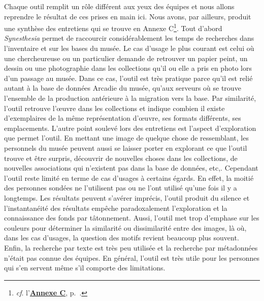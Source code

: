 Chaque outil remplit un rôle différent aux yeux des équipes et nous allons reprendre le résultat de ces prises en main ici. Nous avons, par ailleurs, produit une synthèse des entretiens qui se trouve en Annexe C\footnote{\textit{cf}. l'\textbf{\hyperref[sec:Annexe C]{Annexe C}}, p.~\pageref{sec:Entretiens_2025}.}. Tout d'abord \textit{Synesthesia} permet de raccourcir considérablement les temps de recherches dans l'inventaire et sur les bases du musée. Le cas d'usage le plus courant est celui où un\wokisme e chercheur\wokisme euse ou un particulier demande de retrouver un papier peint, un dessin ou une photographie dans les collections qu'il ou elle a pris en photo lors d'un passage au musée. Dans ce cas, l'outil est très pratique parce qu'il est relié autant à la base de données Arcadie du musée, qu'aux serveurs où se trouve l'ensemble de la production antérieure à la migration vers la base. Par similarité, l'outil retrouve l’œuvre dans les collections et indique combien il existe d'exemplaires de la même représentation d’œuvre, ses formats différents, ses emplacements. L'autre point soulevé lors des entretiens est l'aspect d'exploration que permet l'outil. En mettant une image de quelque chose de ressemblant, les personnels du musée peuvent aussi se laisser porter en explorant ce que l'outil trouve et être surpris, découvrir de nouvelles choses dans les collections, de nouvelles associations qui n'existent pas dans la base de données, etc,. Cependant l'outil reste limité en terme de cas d'usages à certains égards. En effet, la moitié des personnes sondées ne l'utilisent pas ou ne l'ont utilisé qu'une fois il y a longtemps. Les résultats peuvent s'avérer imprécis, l'outil produit du silence et l'instantanéité des résultats empêche paradoxalement l'exploration et la connaissance des fonds par tâtonnement. Aussi, l'outil met trop d'emphase sur les couleurs pour déterminer la similarité ou dissimilarité entre des images, là où, dans les cas d'usages, la question des motifs revient beaucoup plus souvent. Enfin, la recherche par texte est très peu utilisée et la recherche par métadonnées n'était pas connue des équipes. En général, l'outil est très utile pour les personnes qui s'en servent même s'il comporte des limitations.

